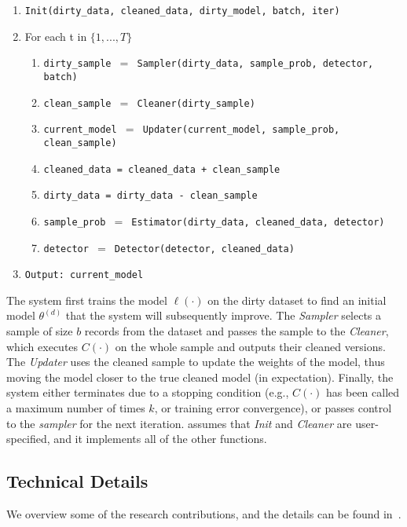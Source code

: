   \begin{enumerate}[leftmargin=1em]\scriptsize\sloppy
  \item \texttt{Init(dirty\_data, cleaned\_data, dirty\_model, batch, iter)}
  \item For each t in $\{1,...,T\}$
  \begin{enumerate}
    \item \texttt{dirty\_sample $=$ Sampler(dirty\_data, sample\_prob, detector, batch)}
    \item \texttt{clean\_sample $=$ Cleaner(dirty\_sample)}
    \item \texttt{current\_model $=$ Updater(current\_model, sample\_prob, clean\_sample)}
    \item \texttt{cleaned\_data = cleaned\_data + clean\_sample}
    \item \texttt{dirty\_data = dirty\_data - clean\_sample}
    \item \texttt{sample\_prob $=$ Estimator(dirty\_data, cleaned\_data, detector)}
    \item \texttt{detector $=$ Detector(detector, cleaned\_data)}
  \end{enumerate}
  \item \texttt{Output: current\_model}
  \end{enumerate}

The system first trains the model $\ell(\cdot)$ on the dirty dataset to find an initial model $\theta^{(d)}$ that the system will subsequently improve.
The {\it Sampler} selects a sample of size $b$ records from the dataset and passes
the sample to the {\it Cleaner}, which executes $C(\cdot)$ on the whole sample and outputs their cleaned versions.
The \emph{Updater} uses the cleaned sample to update the weights of the model, thus moving the model closer to the true cleaned model (in expectation).
Finally, the system either terminates due to a stopping condition (e.g., $C(\cdot)$ has been called a maximum number of times $k$, or training error convergence),
or passes control to the {\it sampler} for the next iteration.
\sys assumes that {\it Init} and {\it Cleaner} are user-specified, and it implements all of the other functions.

\subsection{Technical Details}
We overview some of the research contributions, and the details can be found in~\cite{activecleanarxiv}.

  \vspace{0.5em}

